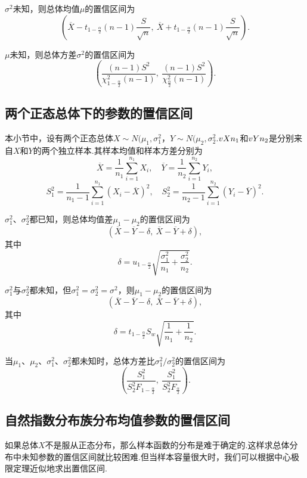 \begin{example}
\(\sigma^2\)未知，则总体均值\(\mu\)的置信区间为\[
\left( \overline{X} - t_{1-\frac{\alpha}{2}}(n-1) \frac{S}{\sqrt{n}},\ \overline{X} + t_{1-\frac{\alpha}{2}}(n-1) \frac{S}{\sqrt{n}} \right).
\]
\end{example}

\begin{example}
\(\mu\)未知，则总体方差\(\sigma^2\)的置信区间为\[
\left( \frac{(n-1)S^2}{\chi_{1-\frac{\alpha}{2}}^2(n-1)},\ \frac{(n-1)S^2}{\chi_{\frac{\alpha}{2}}^2(n-1)} \right).
\]
\end{example}

\subsection{两个正态总体下的参数的置信区间}
本小节中，设有两个正态总体\(X \sim N(\mu_1,\sigma_1^2\)，\(Y \sim N(\mu_2,\sigma_2^2\).\(v{X}{n_1}\)和\(v{Y}{n_2}\)是分别来自\(X\)和\(Y\)的两个独立样本.其样本均值和样本方差分别为\[
\overline{X} = \frac{1}{n_1} \sum\limits_{i=1}^{n_1} X_i,
\quad
\overline{Y} = \frac{1}{n_2} \sum\limits_{i=1}^{n_2} Y_i,
\]\[
S_1^2 = \frac{1}{n_1-1} \sum\limits_{i=1}^{n_1} (X_i-\overline{X})^2, \quad
S_2^2 = \frac{1}{n_2-1} \sum\limits_{i=1}^{n_2} (Y_i-\overline{Y})^2.
\]

\begin{example}
\(\sigma_1^2\)、\(\sigma_2^2\)都已知，则总体均值差\(\mu_1-\mu_2\)的置信区间为\[
\left(\overline{X}-\overline{Y}-\delta,\ \overline{X}-\overline{Y}+\delta\right),
\]其中\[
\delta = u_{1-\frac{\alpha}{2}} \sqrt{\frac{\sigma_1^2}{n_1}+\frac{\sigma_2^2}{n_2}}.
\]
\end{example}

\begin{example}
\(\sigma_1^2\)与\(\sigma_2^2\)都未知，但\(\sigma_1^2=\sigma_2^2=\sigma^2\)，则\(\mu_1-\mu_2\)的置信区间为\[
\left(\overline{X}-\overline{Y}-\delta,\ \overline{X}-\overline{Y}+\delta\right),
\]其中\[
\delta = t_{1-\frac{\alpha}{2}} S_w \sqrt{\frac{1}{n_1}+\frac{1}{n_2}}.
\]
\end{example}

\begin{example}
当\(\mu_1\)、\(\mu_2\)、\(\sigma_1^2\)、\(\sigma_2^2\)都未知时，总体方差比\(\sigma_1^2/\sigma_2^2\)的置信区间为\[
\left(\frac{S_1^2}{S_2^2 F_{1-\frac{\alpha}{2}}},\ \frac{S_1^2}{S_2^2 F_{\frac{\alpha}{2}}}\right).
\]
\end{example}

\subsection{自然指数分布族分布均值参数的置信区间}
如果总体\(X\)不是服从正态分布，那么样本函数的分布是难于确定的.这样求总体分布中未知参数的置信区间就比较困难.但当样本容量很大时，我们可以根据中心极限定理近似地求出置信区间.

